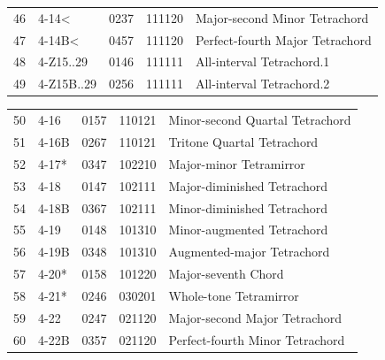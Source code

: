 \documentclass[
	12pt,				%
	openright,			%
	twoside,			%
	a4paper,			%
	english,			%
	french,				%
	spanish,			%
	brazil				%
	]{abntex2}
\begin{document}
\begin{anexosenv}
\begin{table}[h]
\begin{tabular}{lllll}
46 & 4-14\textless                  & 0237  & 111120          & Major-second Minor Tetrachord                     \\
47 & 4-14B\textless                 & 0457  & 111120          & Perfect-fourth Major Tetrachord                   \\
48 & 4-Z15..29                      & 0146  & 111111          & All-interval Tetrachord.1                         \\
49 & 4-Z15B..29                     & 0256  & 111111          & All-interval Tetrachord.2                         \\
\end{tabular}
\end{table}



\pagebreak
\begin{table}[h]
\begin{tabular}{lllll}
50 & 4-16                           & 0157  & 110121          & Minor-second Quartal Tetrachord                   \\
51 & 4-16B                          & 0267  & 110121          & Tritone Quartal Tetrachord                        \\
52 & 4-17*                          & 0347  & 102210          & Major-minor Tetramirror                           \\
53 & 4-18                           & 0147  & 102111          & Major-diminished Tetrachord                       \\
54 & 4-18B                          & 0367  & 102111          & Minor-diminished Tetrachord                       \\
55 & 4-19                           & 0148  & 101310          & Minor-augmented Tetrachord                        \\
56 & 4-19B                          & 0348  & 101310          & Augmented-major Tetrachord                        \\
57 & 4-20*                          & 0158  & 101220          & Major-seventh Chord                               \\
58 & 4-21*                          & 0246  & 030201          & Whole-tone Tetramirror                            \\
59 & 4-22                           & 0247  & 021120          & Major-second Major Tetrachord                     \\
60 & 4-22B                          & 0357  & 021120          & Perfect-fourth Minor Tetrachord                   \\

\end{tabular}
\end{table}
\end{anexosenv}
\end{document}

